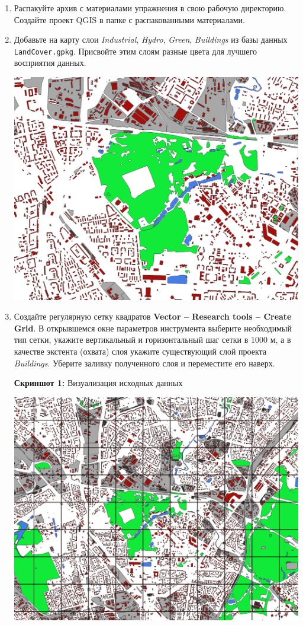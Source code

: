 \documentclass[
  12pt,
]{book}
\begin{document}
\begin{enumerate}
\def\labelenumi{\arabic{enumi}.}
\item
  Распакуйте архив с материалами упражнения в свою рабочую директорию. Создайте проект QGIS в папке с распакованными материалами.
\item
  Добавьте на карту слои \emph{Industrial}, \emph{Hydro}, \emph{Green}, \emph{Buildings} из базы данных \texttt{LandCover.gpkg}. Присвойте этим слоям разные цвета для лучшего восприятия данных.

  \includegraphics{images/Ex06_SpatRelations/Layers.png}
\item
  Создайте регулярную сетку квадратов \textbf{Vector -- Research tools -- Create Grid}. В открывшемся окне параметров инструмента выберите необходимый тип сетки, укажите вертикальный и горизонтальный шаг сетки в 1000 м, а в качестве экстента (охвата) слоя укажите существующий слой проекта \emph{Buildings}. Уберите заливку полученного слоя и переместите его наверх.

  \textbf{Скриншот 1:} Визуализация исходных данных

  \includegraphics{images/Ex06_SpatRelations/Grid.png}
\end{enumerate}
\end{document}

